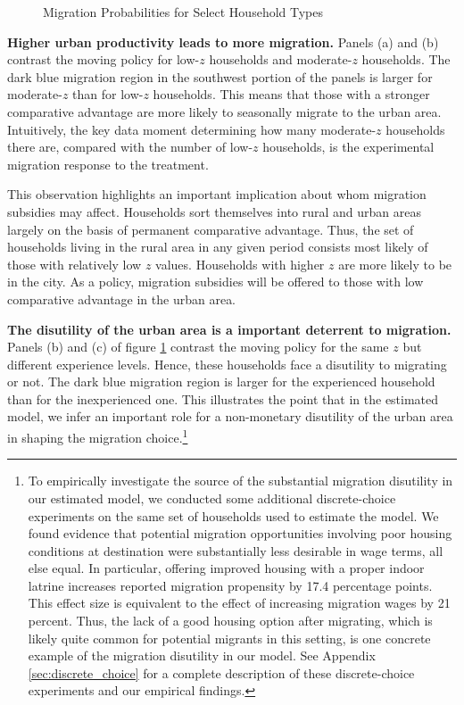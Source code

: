 \documentclass[12pt,pdftex]{article}
\begin{document}
\begin{figure}[t]
\caption{Migration Probabilities for Select Household Types \label{fig:migration_policies}}
\end{figure}



\textbf{Higher urban productivity leads to more migration.} Panels (a) and (b) contrast the moving policy for low-$z$ households and moderate-$z$ households. The dark blue migration region in the southwest portion of the panels is larger for moderate-$z$ than for low-$z$ households. This means that those with a stronger comparative advantage are more likely to seasonally migrate to the urban area. Intuitively, the key data moment determining how many moderate-$z$ households there are, compared with the number of low-$z$ households, is the experimental migration response to the treatment.

This observation highlights an important implication about whom migration subsidies may affect. Households sort themselves into rural and urban areas largely on the basis of permanent comparative advantage. Thus, the set of households living in the rural area in any given period consists most likely of those with relatively low $z$ values. Households with higher $z$ are more likely to be in the city. As a policy, migration subsidies will be offered to those with low comparative advantage in the urban area.

\textbf{The disutility of the urban area is a important deterrent to migration.} Panels (b) and (c) of figure \ref{fig:migration_policies} contrast the moving policy for the same $z$ but different experience levels. Hence, these households face a disutility to migrating or not. The dark blue migration region is larger for the experienced household than for the inexperienced one. This illustrates the point that in the estimated model, we infer an important role for a non-monetary disutility of the urban area in shaping the migration choice.\footnote{To empirically investigate the source of the substantial migration disutility in our estimated model, we conducted some additional discrete-choice experiments on the same set of households used to estimate the model. We found evidence that potential migration opportunities involving poor housing conditions at destination were substantially less desirable in wage terms, all else equal. In particular, offering improved housing with a proper indoor latrine increases reported migration propensity by 17.4 percentage points. This effect size is equivalent to the effect of increasing migration wages by 21 percent. Thus, the lack of a good housing option after migrating, which is likely quite common for potential migrants in this setting, is one concrete example of the migration disutility in our model. See Appendix \ref{sec:discrete_choice} for a complete description of these discrete-choice experiments and our empirical findings.}
\end{document}
